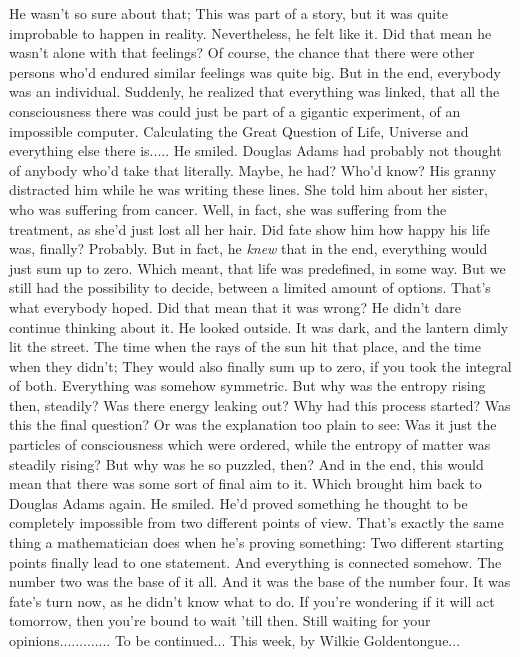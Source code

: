 He wasn't so sure about that; This was part of a story, but it was quite improbable to happen in reality. 
Nevertheless, he felt like it. 
Did that mean he wasn't alone with that feelings?
Of course, the chance that there were other persons who'd endured similar feelings was quite big. 
But in the end, everybody was an individual. 
Suddenly, he realized that everything was linked, that all the consciousness there was could just be part of a gigantic experiment, of an impossible computer. 
Calculating the Great Question of Life, Universe and everything else there is.....
He smiled. 
Douglas Adams had probably not thought of anybody who'd take that literally. 
Maybe, he had?
Who'd know?
His granny distracted him while he was writing these lines. 
She told him about her sister, who was suffering from cancer. 
Well, in fact, she was suffering from the treatment, as she'd just lost all her hair. 
Did fate show him how happy his life was, finally?
Probably. 
But in fact, he \emph{knew} that in the end, everything would just sum up to zero. 
Which meant, that life was predefined, in some way. But we still had the possibility to decide, between a limited amount of options. 
That's what everybody hoped. 
Did that mean that it was wrong?
He didn't dare continue thinking about it. 
He looked outside. It was dark, and the lantern dimly lit the street. The time when the rays of the sun hit that place, and the time when they didn't; They would also finally sum up to zero, if you took the integral of both. 
Everything was somehow symmetric. 
But why was the entropy rising then, steadily?
Was there energy leaking out?
Why had this process started?
Was this the final question?
Or was the explanation too plain to see: Was it just the particles of consciousness which were ordered, while the entropy of matter was steadily rising?
But why was he so puzzled, then?
And in the end, this would mean that there was some sort of final aim to it. 
Which brought him back to Douglas Adams again. 
He smiled. 
He'd proved something he thought to be completely impossible from two different points of view. 
That's exactly the same thing a mathematician does when he's proving something: Two different starting points finally lead to one statement. 
And everything is connected somehow. 
The number two was the base of it all. 
And it was the base of the number four. 
It was fate's turn now, as he didn't know what to do. 
If you're wondering if it will act tomorrow, then you're bound to wait 'till then. 
Still waiting for your opinions.............
To be continued...
This week, by Wilkie Goldentongue...


